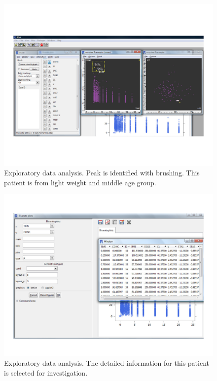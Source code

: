 \documentclass[a4paper]{article}
\begin{document}
\begin{figure}[h!tb]
\centering
\includegraphics[scale=0.6]{c4_s2_5eda1.pdf}
\caption{Exploratory data analysis. Peak is identified with brushing. This patient is from light weight and middle age group.}
\label{c4_s2_5eda1}
\end{figure}
\begin{figure}[h!tb]
\centering
\includegraphics[scale=0.6]{c4_s2_5eda2.pdf}
\caption{Exploratory data analysis. The detailed information for this patient is selected for investigation.}
\label{c4_s2_5eda2}
\end{figure}
\newline
\newline
\end{document}
